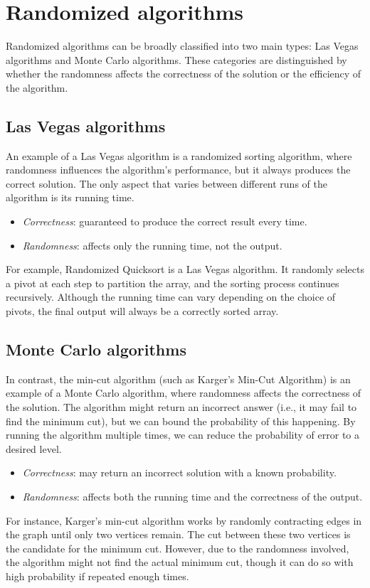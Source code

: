 \section{Randomized algorithms}

Randomized algorithms can be broadly classified into two main types: Las Vegas algorithms and Monte Carlo algorithms. 
These categories are distinguished by whether the randomness affects the correctness of the solution or the efficiency of the algorithm.

\subsection{Las Vegas algorithms}
An example of a Las Vegas algorithm is a randomized sorting algorithm, where randomness influences the algorithm's performance, but it always produces the correct solution. 
The only aspect that varies between different runs of the algorithm is its running time.
\begin{itemize}
    \item \textit{Correctness}: guaranteed to produce the correct result every time.
    \item \textit{Randomness}: affects only the running time, not the output.
\end{itemize}
For example, Randomized Quicksort is a Las Vegas algorithm. 
It randomly selects a pivot at each step to partition the array, and the sorting process continues recursively. 
Although the running time can vary depending on the choice of pivots, the final output will always be a correctly sorted array.

\subsection{Monte Carlo algorithms}
In contrast, the min-cut algorithm (such as Karger's Min-Cut Algorithm) is an example of a Monte Carlo algorithm, where randomness affects the correctness of the solution. 
The algorithm might return an incorrect answer (i.e., it may fail to find the minimum cut), but we can bound the probability of this happening. 
By running the algorithm multiple times, we can reduce the probability of error to a desired level.
\begin{itemize}
    \item \textit{Correctness}: may return an incorrect solution with a known probability.
    \item \textit{Randomness}: affects both the running time and the correctness of the output.
\end{itemize}
For instance, Karger's min-cut algorithm works by randomly contracting edges in the graph until only two vertices remain. 
The cut between these two vertices is the candidate for the minimum cut. 
However, due to the randomness involved, the algorithm might not find the actual minimum cut, though it can do so with high probability if repeated enough times.

